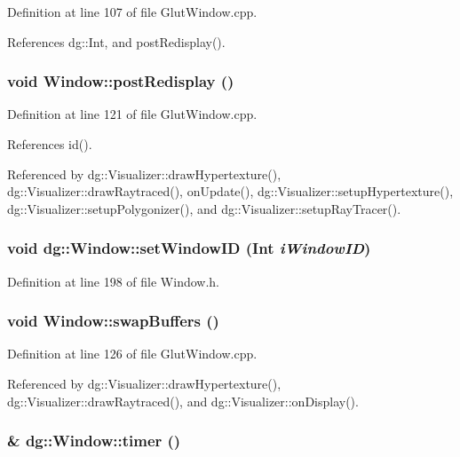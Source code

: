 Definition at line 107 of file Glut\-Window.cpp.

References dg::Int, and post\-Redisplay().
\subsubsection{\setlength{\rightskip}{0pt plus 5cm}void Window::post\-Redisplay ()\hspace{0.3cm}{\tt  [virtual]}}\label{classdg_1_1Window_a8}




Definition at line 121 of file Glut\-Window.cpp.

References id().

Referenced by dg::Visualizer::draw\-Hypertexture(), dg::Visualizer::draw\-Raytraced(), on\-Update(), dg::Visualizer::setup\-Hypertexture(), dg::Visualizer::setup\-Polygonizer(), and dg::Visualizer::setup\-Ray\-Tracer().
\subsubsection{\setlength{\rightskip}{0pt plus 5cm}void dg::Window::set\-Window\-ID ({\bf Int} {\em i\-Window\-ID})\hspace{0.3cm}{\tt  [inline]}}\label{classdg_1_1Window_a31}




Definition at line 198 of file Window.h.
\subsubsection{\setlength{\rightskip}{0pt plus 5cm}void Window::swap\-Buffers ()\hspace{0.3cm}{\tt  [virtual]}}\label{classdg_1_1Window_a9}




Definition at line 126 of file Glut\-Window.cpp.

Referenced by dg::Visualizer::draw\-Hypertexture(), dg::Visualizer::draw\-Raytraced(), and dg::Visualizer::on\-Display().
\subsubsection{ \& dg::Window::timer ()\hspace{0.3cm}{\tt  [inline]}}\label{classdg_1_1Window_a30}




